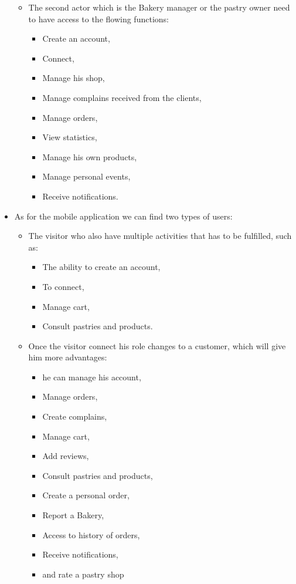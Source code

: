 \documentclass[12pt,a4paper]{report}
\begin{document}
\begin{itemize}
\begin{itemize}
\begin{itemize}
			\end{itemize}
			\item  The second actor which is the Bakery manager	or the pastry owner need to have access to the flowing functions: 
			\begin{itemize}
				\item Create an account,
				\item Connect,
				\item Manage his shop,
				\item Manage complains received from the clients,
				\item Manage orders,
				\item View statistics,
				\item Manage his own products,
				\item Manage personal events,
				\item Receive notifications.		
			\end{itemize}
		\end{itemize}
		\item As for the mobile application we can find two types of users:
		\begin{itemize}
			\item The visitor who also have multiple activities that has to be fulfilled, such as:
			\begin{itemize}
				\item The ability to create an account,
				\item To connect,
				\item Manage cart,
				\item Consult pastries and products.
			\end{itemize}
			\item Once the visitor connect his role changes to a customer, which will give him more advantages:
			\begin{itemize}
				\item he can manage his account,
				\item Manage orders,
				\item Create complains,
				\item Manage cart,
				\item Add reviews,
				\item Consult pastries and products,
				\item Create a personal order,
				\item Report a Bakery,
				\item Access to history of orders,
				\item Receive notifications,
				\item and rate a pastry shop
			\end{itemize}
			
			
		\end{itemize}
	\end{itemize}
	
\end{document}

